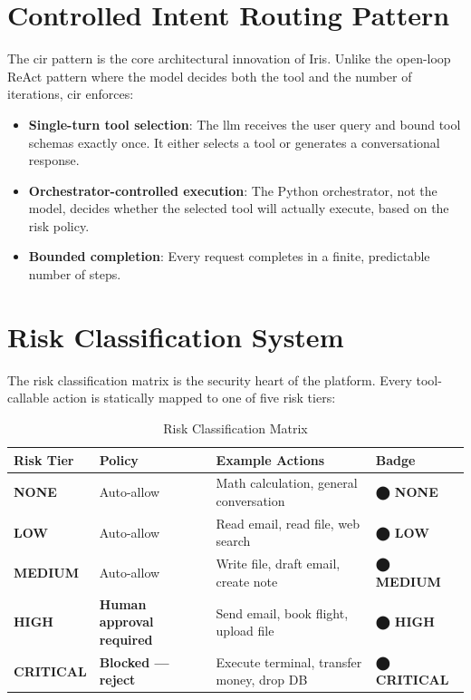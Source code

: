 \section{Controlled Intent Routing Pattern}

The \gls{cir} pattern is the core architectural innovation of Iris. Unlike the open-loop ReAct pattern where the model decides both the tool and the number of iterations, \gls{cir} enforces:

\begin{itemize}[leftmargin=1.5em]
  \item \textbf{Single-turn tool selection}: The \gls{llm} receives the user query and bound tool schemas exactly once. It either selects a tool or generates a conversational response.
  \item \textbf{Orchestrator-controlled execution}: The Python orchestrator, not the model, decides whether the selected tool will actually execute, based on the risk policy.
  \item \textbf{Bounded completion}: Every request completes in a finite, predictable number of steps.
\end{itemize}

\section{Risk Classification System}

The risk classification matrix is the security heart of the platform. Every tool-callable action is statically mapped to one of five risk tiers:

\begin{table}[H]
\centering
\caption{Risk Classification Matrix}
\setlength{\tabcolsep}{5pt}
\begin{tabularx}{\textwidth}{>{\bfseries}l l X l}
\toprule
\textbf{Risk Tier} & \textbf{Policy} & \textbf{Example Actions} & \textbf{Badge} \\
\midrule
\rowcolor{codebg}
NONE & Auto-allow & Math calculation, general conversation & \textcolor{muted}{\textbf{⬤ NONE}} \\
LOW  & Auto-allow & Read email, read file, web search & \textcolor{success}{\textbf{⬤ LOW}} \\
MEDIUM & Auto-allow & Write file, draft email, create note & \textcolor{accent}{\textbf{⬤ MEDIUM}} \\
\rowcolor{lightorange}
HIGH & \textbf{Human approval required} & Send email, book flight, upload file & \textcolor{warning}{\textbf{⬤ HIGH}} \\
\rowcolor{lightred}
CRITICAL & \textbf{Blocked — reject} & Execute terminal, transfer money, drop DB & \textcolor{danger}{\textbf{⬤ CRITICAL}} \\
\bottomrule
\end{tabularx}
\end{table}

